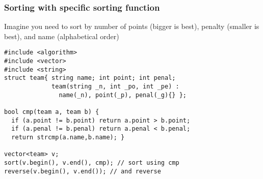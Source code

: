 \begin{frame}[fragile]
  \frametitle{Sorting with specific sorting function}
{\small
  Imagine you need to sort by number of points (bigger is best),
  penalty (smaller is best), and name (alphabetical order)

  \begin{block}{}
\begin{verbatim}
#include <algorithm>
#include <vector>
#include <string>
struct team{ string name; int point; int penal;
             team(string _n, int _po, int _pe) :
               name(_n), point(_p), penal(_g){} };

bool cmp(team a, team b) {
  if (a.point != b.point) return a.point > b.point;
  if (a.penal != b.penal) return a.penal < b.penal;
  return strcmp(a.name,b.name); }

vector<team> v;
sort(v.begin(), v.end(), cmp); // sort using cmp
reverse(v.begin(), v.end()); // and reverse
\end{verbatim}
\end{block}}
\end{frame}
